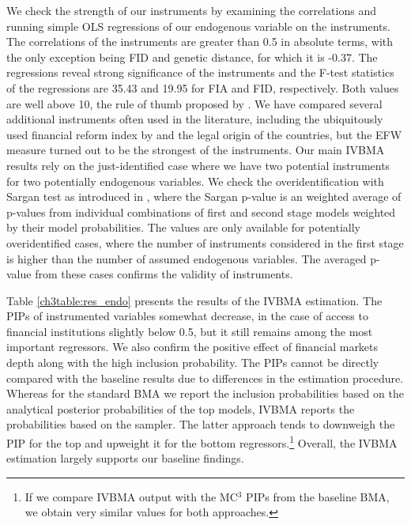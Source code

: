 \begin{refsection}
We check the strength of our instruments by examining the correlations and running simple \ac{OLS} regressions of our endogenous variable on the instruments. The correlations of the instruments are greater than 0.5 in absolute terms, with the only exception being FID and genetic distance, for which it is -0.37. The regressions reveal strong significance of the instruments and the F-test statistics of the regressions are 35.43 and 19.95 for FIA and FID, respectively. Both values are well above 10, the rule of thumb proposed by \textcite{staiger1997instrumental}. We have compared several additional instruments often used in the literature, including the ubiquitously used financial reform index by \textcite{Abiadetal2008} and the legal origin of the countries, but the \ac{EFW} measure turned out to be the strongest of the instruments. Our main \ac{IVBMA} results rely on the just-identified case where we have two potential instruments for two potentially endogenous variables. We check the overidentification with Sargan test as introduced in \textcite{lenkoski2014two}, where the Sargan p-value is an weighted average of p-values from individual combinations of first and second stage models weighted by their model probabilities. The values are only available for potentially overidentified cases, where the number of instruments considered in the first stage is higher than the number of assumed endogenous variables. The averaged p-value from these cases confirms the validity of instruments.

Table \ref{ch3table:res_endo} presents the results of the \ac{IVBMA} estimation. The \acp{PIP} of instrumented variables somewhat decrease, in the case of access to financial institutions slightly below 0.5, but it still remains among the most important regressors. We also confirm the positive effect of financial markets depth along with the high inclusion probability. The \acp{PIP} cannot be directly compared with the baseline results due to differences in the estimation procedure. Whereas for the standard \ac{BMA} we report the inclusion probabilities based on the analytical posterior probabilities of the top models, \ac{IVBMA} reports the probabilities based on the sampler. The latter approach tends to downweigh the \ac{PIP} for the top and upweight it for the bottom regressors.\footnote{If we compare \ac{IVBMA} output with the MC$^3$ \acp{PIP} from the baseline \ac{BMA}, we obtain very similar values for both approaches.} Overall, the \ac{IVBMA} estimation largely supports our baseline findings. 


\end{refsection}
